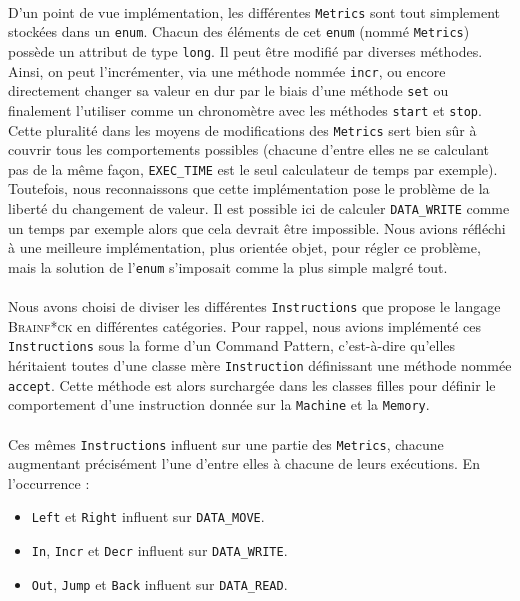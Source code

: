 \documentclass[a4paper]{article}
\begin{document}
\paragraph{}D'un point de vue implémentation, les différentes \texttt{Metrics} sont tout simplement stockées dans un \texttt{enum}. Chacun des éléments de cet \texttt{enum} (nommé \texttt{Metrics}) possède un attribut de type \texttt{long}. Il peut être modifié par diverses méthodes. Ainsi, on peut l'incrémenter, via une méthode nommée \texttt{incr}, ou encore directement changer sa valeur en dur par le biais d'une méthode \texttt{set} ou finalement l'utiliser comme un chronomètre avec les méthodes \texttt{start} et \texttt{stop}. Cette pluralité dans les moyens de modifications des \texttt{Metrics} sert bien sûr à couvrir  tous les comportements possibles (chacune d'entre elles ne se calculant pas de la même façon, \texttt{EXEC\_TIME} est le seul calculateur de temps par exemple). Toutefois, nous reconnaissons que cette implémentation pose le problème de la liberté du changement de valeur. Il est possible ici de calculer \texttt{DATA\_WRITE} comme un temps par exemple alors que cela devrait être impossible. Nous avions réfléchi à une meilleure implémentation, plus orientée objet, pour régler ce problème, mais la solution de l'\texttt{enum} s'imposait comme la plus simple malgré tout.

\paragraph{}Nous avons choisi de diviser les différentes \texttt{Instructions} que propose le langage \textsc{Brainf*ck} en différentes catégories. Pour rappel, nous avions implémenté ces \texttt{Instructions} sous la forme d'un Command Pattern, c'est-à-dire qu'elles héritaient toutes d'une classe mère \texttt{Instruction} définissant une méthode nommée \texttt{accept}. Cette méthode est alors surchargée dans les classes filles pour définir le comportement d'une instruction donnée sur la \texttt{Machine} et la \texttt{Memory}.

\paragraph{}Ces mêmes \texttt{Instructions} influent sur une partie des \texttt{Metrics}, chacune augmentant précisément l'une d'entre elles à chacune de leurs exécutions. En l'occurrence :
\begin{itemize}
	\item \texttt{Left} et \texttt{Right} influent sur \texttt{DATA\_MOVE}.
	\item \texttt{In}, \texttt{Incr} et \texttt{Decr} influent sur \texttt{DATA\_WRITE}.
	\item \texttt{Out}, \texttt{Jump} et \texttt{Back} influent sur \texttt{DATA\_READ}.
\end{itemize}
\end{document}

